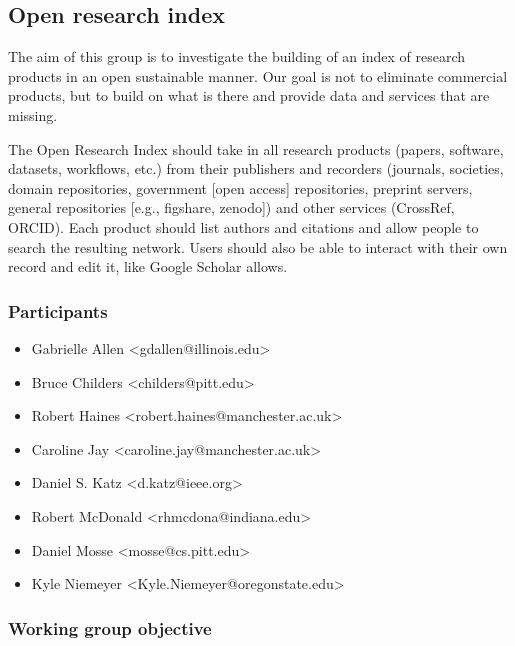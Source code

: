 \subsection{Open research index}
\label{sec:open-research-index}


The aim of this group is to investigate the building of an index of research products in an open sustainable manner.  Our goal is not to eliminate commercial products, but to build on what is there and provide data and services that are missing.

The Open Research Index should take in all research products (papers, software, datasets, workflows, etc.) from their publishers and recorders (journals, societies, domain repositories, government [open access] repositories, preprint servers, general repositories [e.g., figshare, zenodo]) and other services (CrossRef, ORCID).
Each product should list authors and citations and allow people to search the resulting network.
Users should also be able to interact with their own record and edit it, like Google Scholar allows.

\subsubsection{Participants}

\begin{itemize}
\item Gabrielle Allen <gdallen@illinois.edu>
\item Bruce Childers <childers@pitt.edu>
\item Robert Haines <robert.haines@manchester.ac.uk>
\item Caroline Jay <caroline.jay@manchester.ac.uk>
\item Daniel S. Katz <d.katz@ieee.org>
\item Robert McDonald <rhmcdona@indiana.edu>
\item Daniel Mosse <mosse@cs.pitt.edu>
\item Kyle Niemeyer <Kyle.Niemeyer@oregonstate.edu>
\end{itemize}

\subsubsection{Working group objective}

